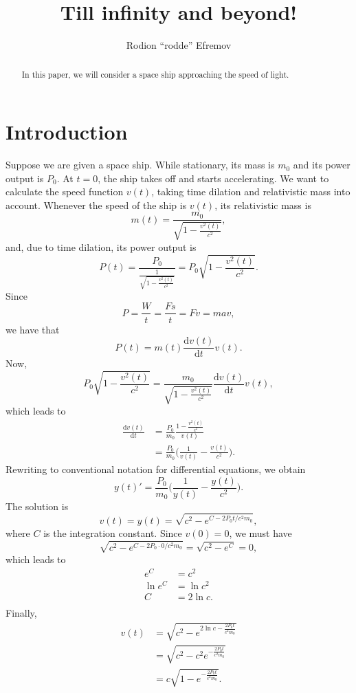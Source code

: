 \documentclass[12pt]{article}
\author{Rodion ``rodde'' Efremov}
\title{Till infinity and beyond!}
\newcommand{\dd}{\mathrm{d}}
\begin{document}
\maketitle

\begin{abstract}
In this paper, we will consider a space ship approaching the speed of light.
\end{abstract}

\section{Introduction}
Suppose we are given a space ship. While stationary, its mass is $m_0$ and its power output is $P_0$. At $t = 0$, the ship takes off and starts accelerating. We want to calculate the speed function $v(t)$, taking time dilation and relativistic mass into account. Whenever the speed of the ship is $v(t)$, its relativistic mass is 
\[
m(t) = \frac{m_0}{\sqrt{1 - \frac{v^2(t)}{c^2}}},
\] 
and, due to time dilation, its power output is
\[
P(t) = \frac{P_0}{\frac{1}{\sqrt{1 - \frac{v^2(t)}{c^2}}}} = P_0 \sqrt{1 - \frac{v^2(t)}{c^2}}.
\]
Since 
\[
P = \frac{W}{t} = \frac{Fs}{t} = Fv = mav,
\]
we have that
\[
P(t) = m(t) \frac{\mathrm{d}v(t)}{\mathrm{d}t}v(t).
\]
Now, 
\[
P_0 \sqrt{1 - \frac{v^2(t)}{c^2}} = \frac{m_0}{\sqrt{1 - \frac{v^2(t)}{c^2}}}\frac{\mathrm{d}v(t)}{\mathrm{d}t}v(t),
\]
which leads to 
\begin{align*}
\frac{\dd v(t)}{\dd t} &= \frac{P_0}{m_0} \frac{1 - \frac{v^2(t)}{c^2}}{v(t)} \\
								 &= \frac{P_0}{m_0} \Bigg( \frac{1}{v(t)} - \frac{v(t)}{c^2} \Bigg).
\end{align*}
Rewriting to conventional notation for differential equations, we obtain
\[
y(t)' = \frac{P_0}{m_0}\Bigg(\frac{1}{y(t)} - \frac{y(t)}{c^2} \Bigg).
\]
The solution is
\[
v(t) = y(t) = \sqrt{c^2 - e^{C - 2P_0t / c^2m_0}},
\]
where $C$ is the integration constant. Since $v(0) = 0$, we must have
\[
\sqrt{c^2 - e^{C - 2P_0 \cdot 0 / c^2m_0}} = \sqrt{c^2 - e^C} = 0,
\]
which leads to
\begin{align*}
e^C &= c^2 \\
\ln e^C &= \ln c^2 \\
C &= 2 \ln c. \\
\end{align*}
Finally,
\begin{align*}
v(t) &= \sqrt{c^2 - e^{2\ln c - \frac{2P_0t}{ c^2m_0 }}} \\
      &= \sqrt{c^2 - c^2 e^{-\frac{2P_0 t }{ c^2 m_0 }}} \\
      &= c \sqrt{1 - e^{-\frac{2P_0 t} { c^2 m_0 }}}.
\end{align*}
\end{document}
